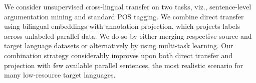 We consider unsupervised cross-lingual transfer on two tasks, viz., sentence-level argumentation mining and standard POS tagging. We combine direct transfer using bilingual embeddings with annotation projection, which projects labels across unlabeled parallel data. We do so by either merging respective source and target language datasets or alternatively by using multi-task learning. Our combination strategy considerably improves upon both direct transfer and projection with few available parallel sentences, the most realistic scenario for many low-resource target languages.
